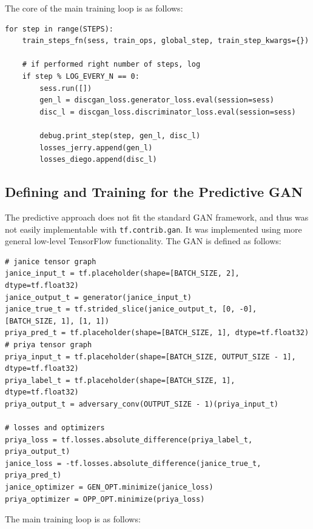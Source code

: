 \documentclass[12pt, titlepage]{report}
\theoremstyle{definition}
\begin{document}
The core of the main training loop is as follows:

\begin{verbatim}
for step in range(STEPS):
    train_steps_fn(sess, train_ops, global_step, train_step_kwargs={})

    # if performed right number of steps, log
    if step % LOG_EVERY_N == 0:
        sess.run([])
        gen_l = discgan_loss.generator_loss.eval(session=sess)
        disc_l = discgan_loss.discriminator_loss.eval(session=sess)

        debug.print_step(step, gen_l, disc_l)
        losses_jerry.append(gen_l)
        losses_diego.append(disc_l)
\end{verbatim}

\subsection{Defining and Training for the Predictive GAN}\label{subsection:training_pred}
The predictive approach does not fit the standard GAN framework, and thus was not easily implementable with \texttt{tf.contrib.gan}. It was implemented using more general low-level TensorFlow functionality. The GAN is defined as follows:

\begin{verbatim}
# janice tensor graph
janice_input_t = tf.placeholder(shape=[BATCH_SIZE, 2], dtype=tf.float32)
janice_output_t = generator(janice_input_t)
janice_true_t = tf.strided_slice(janice_output_t, [0, -0], [BATCH_SIZE, 1], [1, 1])
priya_pred_t = tf.placeholder(shape=[BATCH_SIZE, 1], dtype=tf.float32)
# priya tensor graph
priya_input_t = tf.placeholder(shape=[BATCH_SIZE, OUTPUT_SIZE - 1], dtype=tf.float32)
priya_label_t = tf.placeholder(shape=[BATCH_SIZE, 1], dtype=tf.float32)
priya_output_t = adversary_conv(OUTPUT_SIZE - 1)(priya_input_t)

# losses and optimizers
priya_loss = tf.losses.absolute_difference(priya_label_t, priya_output_t)
janice_loss = -tf.losses.absolute_difference(janice_true_t, priya_pred_t)
janice_optimizer = GEN_OPT.minimize(janice_loss)
priya_optimizer = OPP_OPT.minimize(priya_loss)
\end{verbatim}

The main training loop is as follows:
\end{document}
